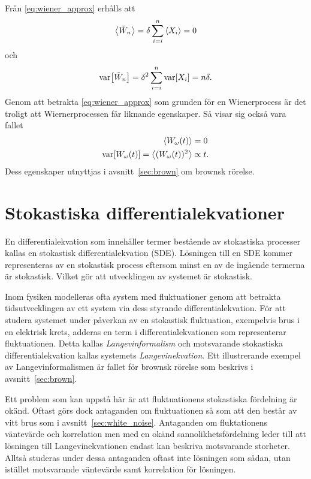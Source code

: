Från \eqref{eq:wiener_approx} erhålls att 
\begin{equation}
\ev{\tilde{W}_n} = \delta \sum_{i=i}^n \ev{X_i} = 0
\end{equation}
och
\begin{equation}
\text{var}\!\left[\tilde{W}_n\right] = \delta^2 \sum_{i=i}^n \text{var}\!\left[X_i\right] = n\delta.
\end{equation}
Genom att betrakta \eqref{eq:wiener_approx} som grunden för en Wienerprocess är det troligt att Wiernerprocessen får liknande egenskaper. Så visar sig också vara fallet~\cite{Miller_probability2012}
\begin{equation}
\begin{aligned}
\ev{W_\omega(t)} &= 0\\
\VAR{ W_\omega(t) } = \ev{ (W_\omega(t))^2 } &\propto t.
\end{aligned}
\end{equation}
Dess egenskaper utnyttjas i avsnitt~\ref{sec:brown} om brownsk rörelse.



\section{Stokastiska differentialekvationer}
En differentialekvation som innehåller termer bestående av stokastiska
processer kallas en stokastisk differentialekvation (SDE). Lösningen
till en SDE kommer representeras av en stokastisk process eftersom
minst en av de ingående termerna är stokastisk. Vilket gör att utvecklingen av systemet är stokastisk.

Inom fysiken modelleras ofta system med fluktuationer genom
att betrakta tidsutvecklingen av ett system via dess styrande
differentialekvation. 
För att studera systemet under påverkan av en stokastisk fluktuation,
exempelvis brus i en elektrisk krets, adderas en term i
differentialekvationen som representerar fluktuationen. 
Detta kallas \emph{Langevinformalism} och motsvarande stokastiska
differentialekvation kallas systemets \emph{Langevinekvation}. 
Ett illustrerande exempel av Langevinformalismen är fallet för
brownsk rörelse som beskrivs i avsnitt~\ref{sec:brown}.

Ett problem som kan uppstå här är att fluktuationens stokastiska fördelning är okänd. Oftast görs dock antaganden om fluktuationen så som att den består av vitt brus som i avsnitt~\ref{sec:white_noise}. 
Antaganden om fluktationens väntevärde och korrelation men med en okänd sannolikhetsfördelning leder till att lösningen till Langevinekvationen endast kan beskriva motsvarande storheter. Alltså studeras under dessa antaganden oftast inte lösningen som sådan, utan istället motsvarande väntevärde samt korrelation för lösningen.  

